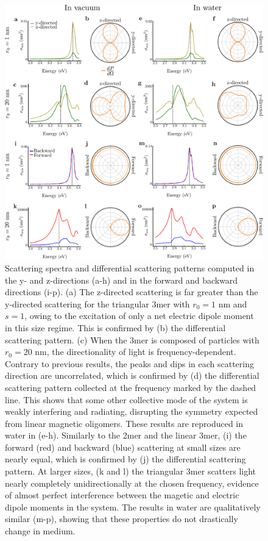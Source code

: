 \documentclass[journal=apchd5,manuscript=article]{achemso}
\begin{document}
\begin{figure}
\includegraphics[width=5.5in]{t3mer_all_scattering.pdf}
\caption{Scattering spectra and differential scattering patterns computed in the y- and z-directions (a-h) and in the forward and backward directions (i-p). (a) The z-directed scattering is far greater than the y-directed scattering for the triangular 3mer with $r_0 = 1$ nm and $s=1$, owing to the excitation of only a net electric dipole moment in this size regime. This is confirmed by (b) the differential scattering pattern. (c) When the 3mer is composed of particles with $r_0 = 20$ nm, the directionality of light is frequency-dependent. Contrary to previous results, the peaks and dips in each scattering direction are uncorrelated, which is confirmed by (d) the differential scattering pattern collected at the frequency marked by the dashed line. This shows that some other collective mode of the system is weakly interfering and radiating, disrupting the symmetry expected from linear magnetic oligomers. These results are reproduced in water in (e-h). Similarly to the 2mer and the linear 3mer, (i) the forward (red) and backward (blue) scattering at small sizes are nearly equal, which is confirmed by (j) the differential scattering pattern. At larger sizes, (k and l) the triangular 3mer scatters light nearly completely unidirectionally at the chosen frequency, evidence of almost perfect interference between the magetic and electric dipole moments in the system. The results in water are qualitatively similar (m-p), showing that these properties do not drastically change in medium.}
\label{t3mer_forback}
\end{figure}
\end{document}
